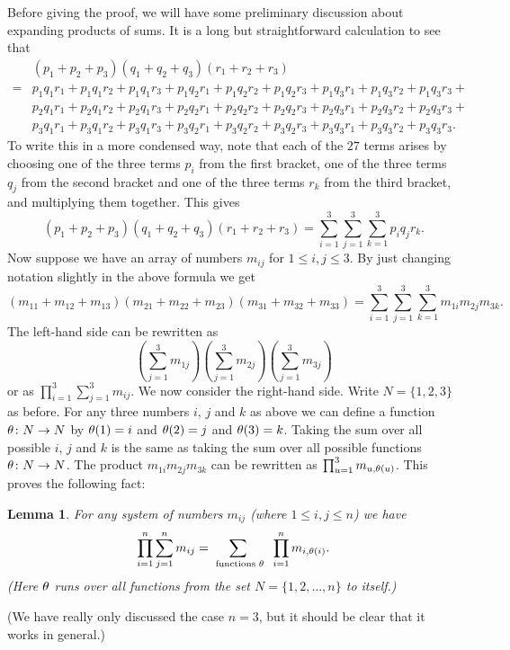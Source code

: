 \documentclass[reqno]{amsart}
\newtheorem{lemma}[theorem]{Lemma}
\theoremstyle{definition}
\begin{document}
Before giving the proof, we will have some preliminary discussion
about expanding products of sums.  It is a long but straightforward
calculation to see that
\begin{align*}
 & (p_1+p_2+p_3)(q_1+q_2+q_3)(r_1+r_2+r_3) \\
 =& p_1q_1r_1+p_1q_1r_2+p_1q_1r_3+
    p_1q_2r_1+p_1q_2r_2+p_1q_2r_3+
    p_1q_3r_1+p_1q_3r_2+p_1q_3r_3+ \\
  & p_2q_1r_1+p_2q_1r_2+p_2q_1r_3+
    p_2q_2r_1+p_2q_2r_2+p_2q_2r_3+
    p_2q_3r_1+p_2q_3r_2+p_2q_3r_3+ \\
  & p_3q_1r_1+p_3q_1r_2+p_3q_1r_3+
    p_3q_2r_1+p_3q_2r_2+p_3q_2r_3+
    p_3q_3r_1+p_3q_3r_2+p_3q_3r_3.
\end{align*}
To write this in a more condensed way, note that each of the $27$
terms arises by choosing one of the three terms $p_i$ from the first
bracket, one of the three terms $q_j$ from the second bracket and one
of the three terms $r_k$ from the third bracket, and multiplying them
together.  This gives
\[ (p_1+p_2+p_3)(q_1+q_2+q_3)(r_1+r_2+r_3) =
    \sum_{i=1}^3\sum_{j=1}^3\sum_{k=1}^3 p_iq_jr_k.
\]
Now suppose we have an array of numbers $m_{ij}$ for
$1\leq i,j\leq 3$.  By just changing notation slightly in the above
formula we get
\[ (m_{11}+m_{12}+m_{13})(m_{21}+m_{22}+m_{23})(m_{31}+m_{32}+m_{33})
    =
    \sum_{i=1}^3\sum_{j=1}^3\sum_{k=1}^3 m_{1i} m_{2j} m_{3k}.
\]
The left-hand side can be rewritten as
\[ \left(\sum_{j=1}^3m_{1j}\right)
   \left(\sum_{j=1}^3m_{2j}\right)
   \left(\sum_{j=1}^3m_{3j}\right)
\]
or as $\prod_{i=1}^3\sum_{j=1}^3m_{ij}$.  We now consider the
right-hand side.  Write $N=\{1,2,3\}$ as before.  For any three numbers $i$,
$j$ and $k$ as above we can define a function $\theta\colon N\to N$ by
$\theta(1)=i$ and $\theta(2)=j$ and $\theta(3)=k$.  Taking the sum over all
possible $i$, $j$ and $k$ is the same as taking the sum over all
possible functions $\theta\colon N\to N$.  The product $m_{1i}m_{2j}m_{3k}$
can be rewritten as $\prod_{u=1}^3m_{u,\theta(u)}$.  This proves the
following fact:
\begin{lemma}\label{lem-expand}
 For any system of numbers $m_{ij}$ (where $1\leq i,j\leq n$) we have
 \[ \prod_{i=1}^n \sum_{j=1}^n m_{ij} =
     \sum_{\text{ functions } \theta} \; \; \prod_{i=1}^n m_{i,\theta(i)}.
 \]
 (Here $\theta$ runs over all functions from the set
 $N=\{1,2,\dotsc,n\}$ to itself.)
\end{lemma}
(We have really only discussed the case $n=3$, but it should be clear
that it works in general.)
\end{document}
